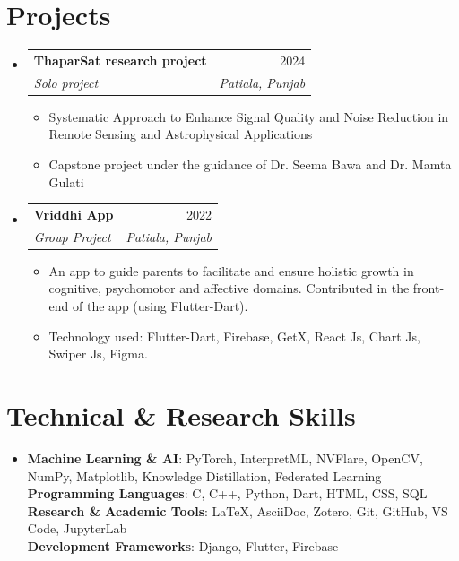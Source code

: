 \documentclass[letterpaper,11pt]{article}
\makeatletter
\newcommand{\resumeItem}[1]{
  \item\small{
    {#1 \vspace{-2pt}}
  }
}
\newcommand{\resumeSubheading}[4]{
  \vspace{-2pt}\item
    \begin{tabular*}{0.97\textwidth}[t]{l@{\extracolsep{\fill}}r}
      \textbf{#1} & #2 \\
      \textit{\small#3} & \textit{\small #4} \\
    \end{tabular*}\vspace{-7pt}
}
\newcommand{\resumeSubHeadingListStart}{\begin{itemize}[leftmargin=0.15in, label={}]}
\newcommand{\resumeSubHeadingListEnd}{\end{itemize}}
\newcommand{\resumeItemListStart}{\begin{itemize}}
\newcommand{\resumeItemListEnd}{\end{itemize}\vspace{-5pt}}
\makeatother
\begin{document}
\section{Projects}
  \resumeSubHeadingListStart
      \resumeSubheading
      {ThaparSat research project}{2024}
      {Solo project}{Patiala, Punjab}
            \resumeItemListStart
                \resumeItem{Systematic Approach to Enhance Signal Quality and Noise Reduction in Remote Sensing and Astrophysical Applications}
                \resumeItem{Capstone project under the guidance of Dr. Seema Bawa and Dr. Mamta Gulati}
              \resumeItemListEnd
            \resumeSubheading
      {Vriddhi App}{2022}
      {Group Project}{Patiala, Punjab}
            \resumeItemListStart
                \resumeItem{An app to guide parents to facilitate and ensure holistic growth in cognitive, psychomotor and affective domains. Contributed in the front-end of the app (using Flutter-Dart).}
                \resumeItem{Technology used: Flutter-Dart, Firebase, GetX, React Js, Chart Js, Swiper Js, Figma.}
              \resumeItemListEnd
          \resumeSubHeadingListEnd

\section{Technical \& Research Skills}
 \resumeSubHeadingListStart
   \item{
        \textbf{Machine Learning \& AI}{: PyTorch, InterpretML, NVFlare, OpenCV, NumPy, Matplotlib, Knowledge Distillation, Federated Learning} \\         \textbf{Programming Languages}{: C, C++, Python, Dart, HTML, CSS, SQL} \\         \textbf{Research \& Academic Tools}{: LaTeX, AsciiDoc, Zotero, Git, GitHub, VS Code, JupyterLab} \\         \textbf{Development Frameworks}{: Django, Flutter, Firebase}       }
 \resumeSubHeadingListEnd

\end{document}
